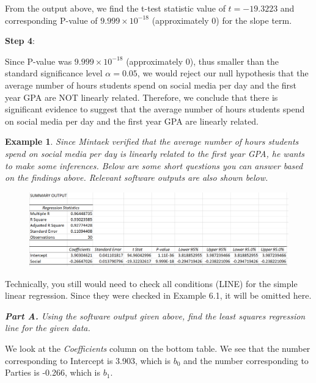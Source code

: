 \documentclass[12pt]{article}
\newcounter{lecnum}
\newtheorem{example}{Example}[lecnum]
\begin{document}
From the output above, we find the t-test statistic value of $t = -19.3223$ and corresponding P-value of $9.999 \times 10^{-18}$ (approximately 0) for the slope term.

\vspace{10 pt}

\noindent \textbf{Step 4}: 

Since P-value was $9.999 \times 10^{-18}$ (approximately 0), thus smaller than the standard significance level $\alpha = 0.05$, we would reject our null hypothesis that the average number of hours students spend on social media per day and the first year GPA are NOT linearly related. Therefore, we conclude that there is significant evidence to suggest that the average number of hours students spend on social media per day and the first year GPA are linearly related.

\pagebreak

\begin{example}
	Since Mintaek verified that the average number of hours students spend on social media per day is linearly related to the first year GPA, he wants to make some inferences. Below are some short questions you can answer based on the findings above. Relevant software outputs are also shown below.

	\begin{figure}[!h]
		\centering
		\vspace{-10 pt}
		\includegraphics[width=\linewidth]{Figures/fig12.png}
		\vspace{-10 pt}
	\end{figure}
\end{example}

Technically, you still would need to check all conditions (LINE) for the simple linear regression. Since they were checked in Example 6.1, it will be omitted here.

\textit{\textbf{Part A.} Using the software output given above, find the least squares regression line for the given data.}

We look at the \textit{Coefficients} column on the bottom table. We see that the number corresponding to Intercept is 3.903, which is $b_0$ and the number corresponding to Parties is -0.266, which is $b_1$.
\end{document}
